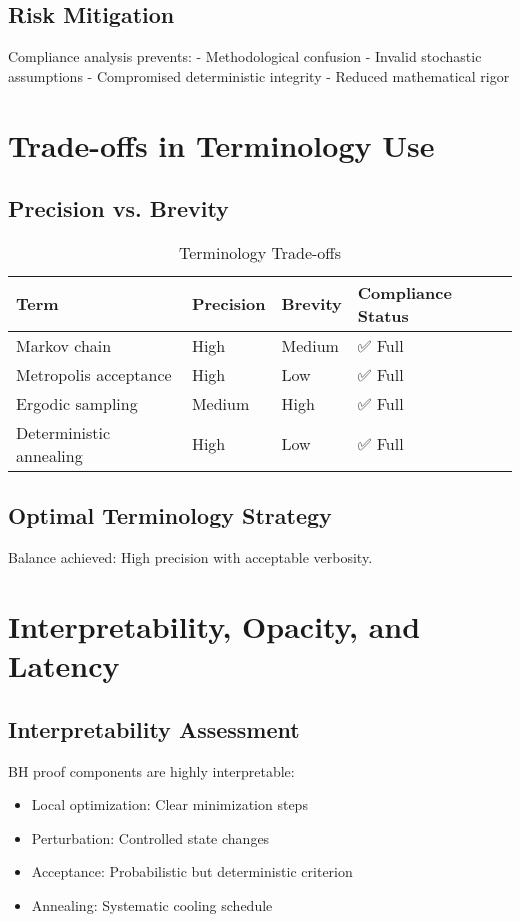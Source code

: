 \documentclass[11pt,a4paper]{article}
\begin{document}
\subsection{Risk Mitigation}
Compliance analysis prevents:
- Methodological confusion
- Invalid stochastic assumptions
- Compromised deterministic integrity
- Reduced mathematical rigor

\section{Trade-offs in Terminology Use}

\subsection{Precision vs. Brevity}
\begin{table}[H]
\centering
\caption{Terminology Trade-offs}
\label{tab:tradeoffs}
\begin{tabular}{@{}llll@{}}
\toprule
Term & Precision & Brevity & Compliance Status \\
\midrule
Markov chain & High & Medium & \textcolor{compliant}{✅ Full} \\
Metropolis acceptance & High & Low & \textcolor{compliant}{✅ Full} \\
Ergodic sampling & Medium & High & \textcolor{compliant}{✅ Full} \\
Deterministic annealing & High & Low & \textcolor{compliant}{✅ Full} \\
\bottomrule
\end{tabular}
\end{table}

\subsection{Optimal Terminology Strategy}
\textcolor{compliant}{Balance achieved}: High precision with acceptable verbosity.

\section{Interpretability, Opacity, and Latency}

\subsection{Interpretability Assessment}
BH proof components are highly interpretable:
\begin{itemize}
\item Local optimization: Clear minimization steps
\item Perturbation: Controlled state changes
\item Acceptance: Probabilistic but deterministic criterion
\item Annealing: Systematic cooling schedule
\end{itemize}
\end{document}
